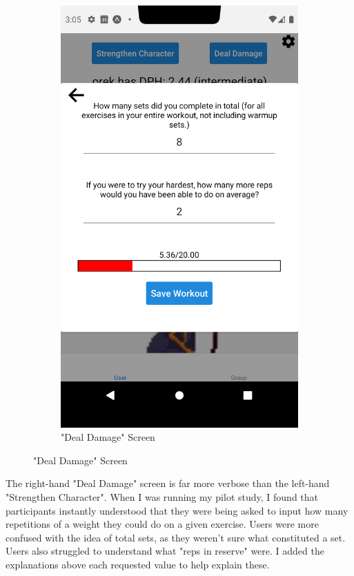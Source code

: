 \documentclass{l4proj}
\begin{document}
\begin{figure}[H]
\begin{subfigure}{0.45\textwidth}
      \includegraphics[width=\textwidth]{workout_modal.png}    
      \caption{"Deal Damage" Screen}
    \end{subfigure}
\end{figure}

The right-hand "Deal Damage" screen is far more verbose than the left-hand "Strengthen Character". When I was running my pilot study, I found that participants instantly understood that they were being asked to input how many repetitions of a weight they could do on a given exercise. Users were more confused with the idea of total sets, as they weren't sure what constituted a set. Users also struggled to understand what "reps in reserve" were. I added the explanations above each requested value to help explain these.
\end{document}

